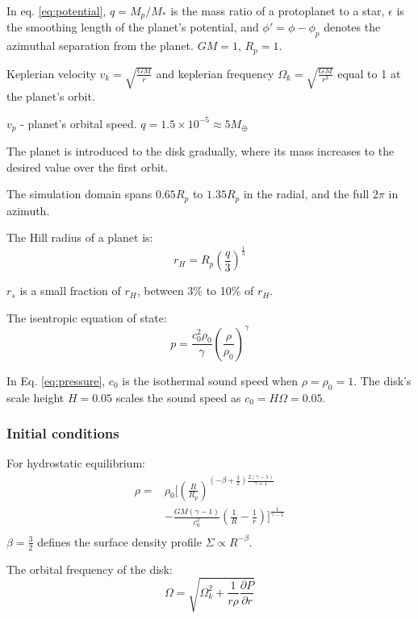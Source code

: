 \documentclass[twocolumn]{aastex631}
\begin{document}
In eq. \ref{eq:potential}, $q = M_p/M_*$ is the mass ratio of a protoplanet to a star, $\epsilon$ is the smoothing length of the planet's potential, and $\phi'= \phi-\phi_p$ denotes the azimuthal separation from the planet. $GM=1$, $R_p=1$.

Keplerian velocity $v_k=\sqrt{\frac{GM}{r}}$ and keplerian frequency $\Omega_k=\sqrt{\frac{GM}{r^3}}$ equal to 1 at the planet's orbit.

$v_p$ - planet's orbital speed. 
$q = 1.5\times 10^{-5} \approx 5 M_{\oplus}$

The planet is introduced to the disk gradually, where its mass increases to the desired value over the first orbit.

The simulation domain spans $0.65R_p$ to $1.35R_p$ in the radial, and the full $2\pi$ in azimuth.

The Hill radius of a planet is:
\begin{equation}\label{eq:Hill}
    r_H=R_p\left(\frac{q}{3}\right)^{\frac{1}{3}}
\end{equation}

$r_s$ is a small fraction of $r_H$, between 3\% to 10\% of $r_H$.

The isentropic equation of state:
\begin{equation}\label{eq:pressure}
    p = \frac{c_0^2\rho_0}{\gamma}\left(\frac{\rho}{\rho_0}\right)^\gamma
\end{equation}

In Eq. \ref{eq:pressure}, $c_0$ is the isothermal sound speed when $\rho=\rho_0=1$. 
The disk's scale height $H = 0.05$ scales the sound speed as $c_0 = H\Omega=0.05$.

\subsubsection{Initial conditions}
For hydrostatic equilibrium:
\begin{equation}\label{eq:density}
\begin{aligned}
     \rho = & \rho_0 \bigg[\left(\frac{R}{R_p}\right)^{(-\beta+\frac{3}{2})\frac{2(\gamma-1)}{\gamma+1}} \\ 
    & - \frac{GM(\gamma-1)}{c_0^2}\left(\frac{1}{R}-\frac{1}{r}\right)\bigg]^{\frac{1}{\gamma-1}} \\
\end{aligned}
\end{equation}
$\beta=\frac{3}{2}$ defines the surface density profile $\Sigma\propto R^{-\beta}$.

The orbital frequency of the disk:
\begin{equation}\label{eq:omegadisk}
    \Omega = \sqrt{\Omega_k^2+\frac{1}{r\rho}\frac{\partial P}{\partial r}}
\end{equation}
\end{document}
